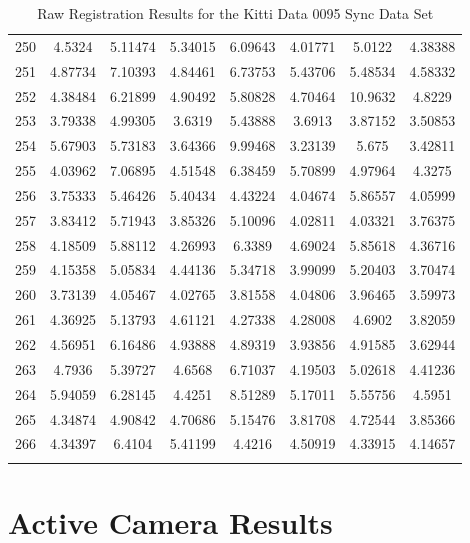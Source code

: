 \begin{center}
\begin{longtable}{cccccccc}
250 & 4.5324 & 5.11474 & 5.34015 & 6.09643 & 4.01771 & 5.0122 & 4.38388\\
251 & 4.87734 & 7.10393 & 4.84461 & 6.73753 & 5.43706 & 5.48534 & 4.58332\\
252 & 4.38484 & 6.21899 & 4.90492 & 5.80828 & 4.70464 & 10.9632 & 4.8229\\
253 & 3.79338 & 4.99305 & 3.6319 & 5.43888 & 3.6913 & 3.87152 & 3.50853\\
254 & 5.67903 & 5.73183 & 3.64366 & 9.99468 & 3.23139 & 5.675 & 3.42811\\
255 & 4.03962 & 7.06895 & 4.51548 & 6.38459 & 5.70899 & 4.97964 & 4.3275\\
256 & 3.75333 & 5.46426 & 5.40434 & 4.43224 & 4.04674 & 5.86557 & 4.05999\\
257 & 3.83412 & 5.71943 & 3.85326 & 5.10096 & 4.02811 & 4.03321 & 3.76375\\
258 & 4.18509 & 5.88112 & 4.26993 & 6.3389 & 4.69024 & 5.85618 & 4.36716\\
259 & 4.15358 & 5.05834 & 4.44136 & 5.34718 & 3.99099 & 5.20403 & 3.70474\\
260 & 3.73139 & 4.05467 & 4.02765 & 3.81558 & 4.04806 & 3.96465 & 3.59973\\
261 & 4.36925 & 5.13793 & 4.61121 & 4.27338 & 4.28008 & 4.6902 & 3.82059\\
262 & 4.56951 & 6.16486 & 4.93888 & 4.89319 & 3.93856 & 4.91585 & 3.62944\\
263 & 4.7936 & 5.39727 & 4.6568 & 6.71037 & 4.19503 & 5.02618 & 4.41236\\
264 & 5.94059 & 6.28145 & 4.4251 & 8.51289 & 5.17011 & 5.55756 & 4.5951\\
265 & 4.34874 & 4.90842 & 4.70686 & 5.15476 & 3.81708 & 4.72544 & 3.85366\\
266 & 4.34397 & 6.4104 & 5.41199 & 4.4216 & 4.50919 & 4.33915 & 4.14657\\
\caption{Raw Registration Results for the Kitti Data 0095 Sync Data Set}
\label{tab:kittidata0095syncFULL}
\end{longtable}
\end{center} 

\section{Active Camera Results}
\label{ActiveResultsRaw}

